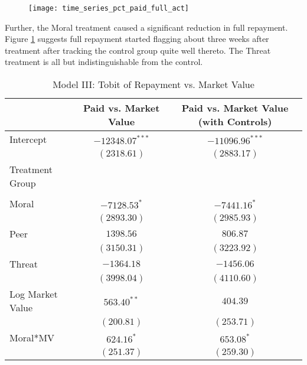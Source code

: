 \documentclass[12pt,titlepage]{article}
\begin{document}
\begin{figure}[htbp]
\begin{center}
\caption{} \label{paid_full_act}
\texttt{[image: time\_series\_pct\_paid\_full\_act]}
\par\end{center}
\end{figure}

Further, the Moral treatment caused a significant reduction in full
repayment. Figure \ref{paid_full_act} suggests full repayment started
flagging about three weeks after treatment after tracking the control
group quite well thereto. The Threat treatment is all but
indistinguishable from the control.

\begin{table}[htbp]
\begin{center}
\caption{Model III: Tobit of Repayment vs. Market Value} \label{table:modelIII}
\begin{tabular}{l c c }
\hline
                       & Paid vs. Market Value & Paid vs. Market Value (with Controls) \\
\hline
Intercept              & $-12348.07^{***}$ & $-11096.96^{***}$ \\
                       & $(2318.61)$       & $(2883.17)$       \\
Treatment Group        &                   &                   \\
                       &                   &                   \\
\quad Moral            & $-7128.53^{*}$    & $-7441.16^{*}$    \\
                       & $(2893.30)$       & $(2985.93)$       \\
\quad Peer             & $1398.56$         & $806.87$          \\
                       & $(3150.31)$       & $(3223.92)$       \\
\quad Threat           & $-1364.18$        & $-1456.06$        \\
                       & $(3998.04)$       & $(4110.60)$       \\
Log Market Value       & $563.40^{**}$     & $404.39$          \\
                       & $(200.81)$        & $(253.71)$        \\
Moral*MV               & $624.16^{*}$      & $653.08^{*}$      \\
                       & $(251.37)$        & $(259.30)$        \\

\end{tabular}
\end{center}
\end{table}
\end{document}
